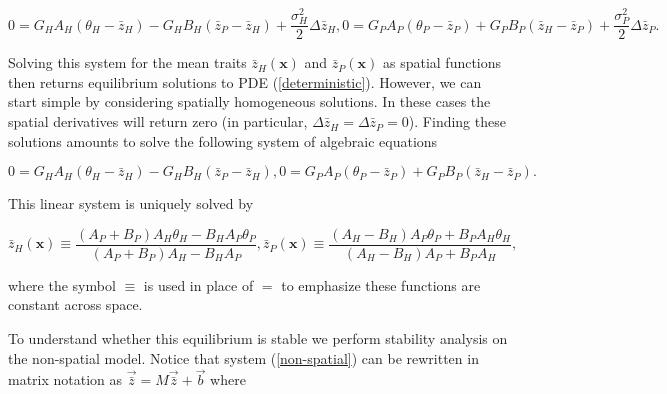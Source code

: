 \documentclass{article}
\begin{document}
\begin{subequations}
  \begin{equation}
    0=G_HA_H(\theta_H-\bar z_H)-G_HB_H(\bar z_P-\bar z_H)+\frac{\sigma^2_H}{2}\Delta\bar z_H,
  \end{equation}
  \begin{equation}
    0=G_PA_P(\theta_P-\bar z_P)+G_PB_P(\bar z_H-\bar z_P)+\frac{\sigma^2_P}{2}\Delta\bar z_P.
  \end{equation}
\end{subequations}

Solving this system for the mean traits \(\bar z_H(\pmb x)\) and
\(\bar z_P(\pmb x)\) as spatial functions then returns equilibrium
solutions to PDE (\ref{deterministic}). However, we can start simple by
considering spatially homogeneous solutions. In these cases the spatial
derivatives will return zero (in particular,
\(\Delta\bar z_H=\Delta\bar z_P=0\)). Finding these solutions amounts to
solve the following system of algebraic equations

\begin{subequations}
  \begin{equation}
    0=G_HA_H(\theta_H-\bar z_H)-G_HB_H(\bar z_P-\bar z_H),
  \end{equation}
  \begin{equation}
    0=G_PA_P(\theta_P-\bar z_P)+G_PB_P(\bar z_H-\bar z_P).
  \end{equation}
\end{subequations}

This linear system is uniquely solved by

\begin{subequations}\label{non-spatial-eq}
  \begin{equation}
    \bar z_H(\pmb x)\equiv\frac{(A_P+B_P)A_H\theta_H-B_HA_P\theta_P}{(A_P+B_P)A_H-B_HA_P},
  \end{equation}
  \begin{equation}
    \bar z_P(\pmb x)\equiv\frac{(A_H-B_H)A_P\theta_P+B_PA_H\theta_H}{(A_H-B_H)A_P+B_PA_H},
  \end{equation}
\end{subequations}

where the symbol \(\equiv\) is used in place of \(=\) to emphasize these
functions are constant across space.

To understand whether this equilibrium is stable we perform stability
analysis on the non-spatial model. Notice that system
(\ref{non-spatial}) can be rewritten in matrix notation as
\(\vec{\bar z}=M\vec{\bar z}+\vec b\) where
\end{document}
